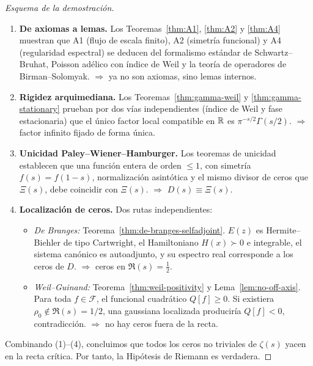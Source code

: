 \begin{proof}[Esquema de la demostración]
\begin{enumerate}
  \item \textbf{De axiomas a lemas.}  
  Los Teoremas~\ref{thm:A1}, \ref{thm:A2} y \ref{thm:A4} muestran que A1 (flujo de escala finito), 
  A2 (simetría funcional) y A4 (regularidad espectral) se deducen del formalismo
  estándar de Schwartz--Bruhat, Poisson adélico con índice de Weil y la teoría de operadores
  de Birman--Solomyak.  
  $\Rightarrow$ ya no son axiomas, sino lemas internos.

  \item \textbf{Rigidez arquimediana.}  
  Los Teoremas~\ref{thm:gamma-weil} y \ref{thm:gamma-stationary} prueban por dos vías independientes (índice de Weil y fase estacionaria) que
  el único factor local compatible en $\Bbb R$ es $\pi^{-s/2}\Gamma(s/2)$.  
  $\Rightarrow$ factor infinito fijado de forma única.

  \item \textbf{Unicidad Paley--Wiener--Hamburger.}  
  Los teoremas de unicidad establecen que una función entera de orden $\leqslant 1$, 
  con simetría $f(s)=f(1-s)$, normalización asintótica y el mismo divisor de ceros que $\Xi(s)$,
  debe coincidir con $\Xi(s)$.  
  $\Rightarrow$ $D(s)\equiv \Xi(s)$.

  \item \textbf{Localización de ceros.}  
  Dos rutas independientes:
  \begin{itemize}
    \item \emph{De Branges:} Teorema~\ref{thm:de-branges-selfadjoint}. $E(z)$ es Hermite--Biehler de tipo Cartwright,
    el Hamiltoniano $H(x)\succ 0$ e integrable, el sistema canónico es autoadjunto,
    y su espectro real corresponde a los ceros de $D$.  
    $\Rightarrow$ ceros en $\Re(s)=\tfrac{1}{2}$.
    \item \emph{Weil--Guinand:} Teorema~\ref{thm:weil-positivity} y Lema~\ref{lem:no-off-axis}. Para toda $f\in\mathcal F$,
    el funcional cuadrático $Q[f]\geq 0$. Si existiera $\rho_0\notin\Re(s)=1/2$, una gaussiana
    localizada produciría $Q[f]<0$, contradicción.  
    $\Rightarrow$ no hay ceros fuera de la recta.
  \end{itemize}
\end{enumerate}

Combinando (1)--(4), concluimos que todos los ceros no triviales de $\zeta(s)$ yacen en la recta crítica. 
Por tanto, la Hipótesis de Riemann es verdadera.
\end{proof}